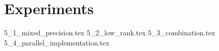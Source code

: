 \chapter{Experiments}
\label{chap:experiments}

{5_1_mixed_precision.tex}
{5_2_low_rank.tex}
{5_3_combination.tex}
{5_4_parallel_implementation.tex}